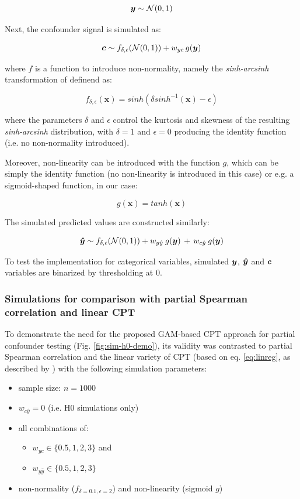 \documentclass{article}
\begin{document}
$$ \boldsymbol{y} \sim \mathcal{N}(0, 1) $$

Next, the confounder signal is simulated as:

$$ \boldsymbol{c} \sim f_{\delta, \epsilon}(\mathcal{N}(0, 1)) + w_{yc} \, g(\boldsymbol{y}) $$

where $f$ is a function to introduce non-normality, namely the \emph{sinh-arcsinh} transformation of \cite{jones2009sinh} definend as:

$$f_{\delta, \epsilon}(\boldsymbol{x}) = sinh(\delta sinh^{-1}(\boldsymbol{x}) - \epsilon)$$

where the parameters $\delta$ and $\epsilon$ control the kurtosis and skewness of the resulting \emph{sinh-arcsinh} distribution, with $\delta=1$ and $\epsilon=0$ producing the identity function (i.e. no non-normality introduced).

Moreover, non-linearity can be introduced with the function $g$, which can be simply the identity function (no non-linearity is introduced in this case) or e.g. a sigmoid-shaped function, in our case:

$$ g(\boldsymbol{x}) = tanh(\boldsymbol{x}) $$


The simulated predicted values are constructed similarly:

$$ \boldsymbol{\hat{y}} \sim f_{\delta, \epsilon}(\mathcal{N}(0, 1)) + w_{y\hat{y}} \: g(\boldsymbol{y}) \, + \, w_{c\hat{y}} \: g(\boldsymbol{y})$$

To test the implementation for categorical variables, simulated $\boldsymbol{y}$, $\boldsymbol{\hat{y}}$ and $\boldsymbol{c}$ variables are binarized by thresholding at 0.

\subsubsection*{Simulations for comparison with partial Spearman correlation and linear CPT}

To demonstrate the need for the proposed GAM-based CPT approach for partial confounder testing (Fig. \ref{fig:sim-h0-demo}), its validity was contrasted to partial Spearman correlation and the linear variety of CPT (based on eq. \ref{eq:linreg}, as described by \cite{berrett2020conditional}) with the following simulation parameters:
\begin{itemize}
    \item sample size: $n = 1000$
    \item $w_{c\hat{y}} = 0$ (i.e. H0 simulations only)
    \item all combinations of:
    \begin{itemize}
        \item $w_{yc} \in \{0.5, 1, 2, 3\}$ and
        \item $w_{y\hat{y}} \in \{0.5, 1, 2, 3\}$
    \end{itemize}
    \item non-normality ($f_{\delta = 0.1, \epsilon = 2}$) and non-linearity (sigmoid $g$)
\end{itemize}
\end{document}
